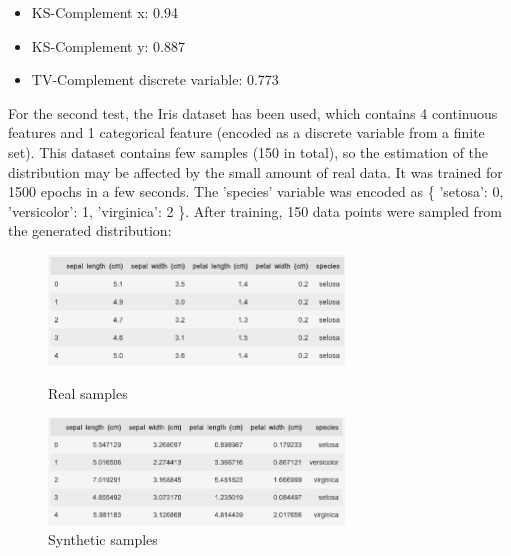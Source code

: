 \begin{itemize}
    \item KS-Complement x: 0.94
    \item KS-Complement y: 0.887
    \item TV-Complement discrete variable: 0.773
\end{itemize}

For the second test, the Iris dataset has been used, which contains 4 continuous features and 1 categorical feature (encoded as a discrete variable from a finite set). This dataset contains few samples (150 in total), so the estimation of the distribution may be affected by the small amount of real data. It was trained for 1500 epochs in a few seconds. The 'species' variable was encoded as \{ 'setosa': 0, 'versicolor': 1, 'virginica': 2 \}. After training, 150 data points were sampled from the generated distribution:\\

\begin{figure}[htbp]
    \centering
    \begin{minipage}[b]{0.5\textwidth}
      \centering
      \includegraphics[width=0.7\textwidth]{figures/4-Advanced_Strategies/Ejemplo_Dataset_2_Real.png}
      \caption{Real samples}
    \end{minipage}
    \hfill
    \begin{minipage}[b]{0.5\textwidth}
      \centering
      \includegraphics[width=0.7\textwidth]{figures/4-Advanced_Strategies/Ejemplo_Dataset_2_Sintetico.png}
      \caption{Synthetic samples}
    \end{minipage}
\end{figure}

